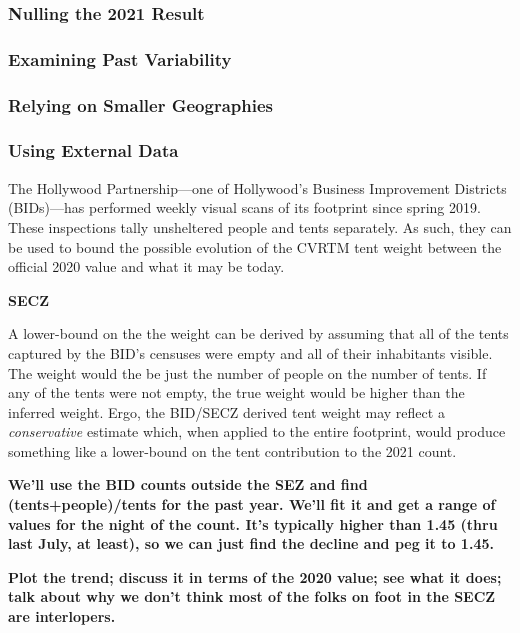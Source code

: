 \documentclass[11pt,twocolumn]{article}
\def\bfr{\bf\color{red}}
\def\Count{count}
\begin{document}
\subsubsection{Nulling the 2021 Result}
\label{sec:nullOut}

\subsubsection{Examining Past Variability}
\label{sec:pastValues}

\subsubsection{Relying on Smaller Geographies}
\label{sec:cdWts}

\subsubsection{Using External Data}
\label{sec:bidData}

The Hollywood Partnership---one of Hollywood's Business Improvement Districts (BIDs)---has performed
weekly visual scans of its footprint since spring 2019. These inspections tally unsheltered people and 
tents separately. As such, they can be used to bound the possible evolution of the CVRTM tent weight
between the official 2020 value and what it may be today.

{\bfr SECZ}

A lower-bound on the the weight can be derived by assuming that all of the tents captured by the BID's 
censuses were empty and all of their inhabitants visible. The weight would the be just the number of
people on the number of tents. If any of the tents were not empty, the true weight would be higher than
the inferred weight. Ergo, the BID/SECZ derived tent weight may reflect a {\it conservative} estimate 
which, when applied to the entire footprint, would produce something like a lower-bound on the 
tent contribution to the 2021 \Count.

{\bfr We'll use the BID counts outside the SEZ and find (tents+people)/tents for the past year. We'll
fit it and get a range of values for the night of the count. It's typically higher than 1.45 (thru last July,
at least), so we can just find the decline and peg it to 1.45.}

{\bfr Plot the trend; discuss it in terms of the 2020 value; see what it does; talk about why we don't
think most of the folks on foot in the SECZ are interlopers.}
\end{document}
